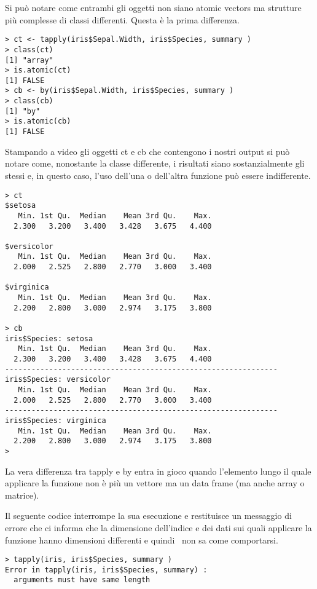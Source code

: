 Si può notare come entrambi gli oggetti non siano atomic vectors ma strutture più complesse di classi differenti.  Questa è la prima differenza.
\begin{lstlisting}	
> ct <- tapply(iris$Sepal.Width, iris$Species, summary )
> class(ct)
[1] "array"
> is.atomic(ct)
[1] FALSE
> cb <- by(iris$Sepal.Width, iris$Species, summary )
> class(cb)
[1] "by"
> is.atomic(cb)
[1] FALSE
\end{lstlisting}

Stampando a video gli oggetti ct e cb che contengono i nostri output si può notare come, nonostante la classe differente, i risultati siano sostanzialmente gli stessi e, in questo caso, l'uso dell'una o dell'altra funzione può essere indifferente.

\begin{lstlisting}	
> ct
$setosa
   Min. 1st Qu.  Median    Mean 3rd Qu.    Max. 
  2.300   3.200   3.400   3.428   3.675   4.400 

$versicolor
   Min. 1st Qu.  Median    Mean 3rd Qu.    Max. 
  2.000   2.525   2.800   2.770   3.000   3.400 

$virginica
   Min. 1st Qu.  Median    Mean 3rd Qu.    Max. 
  2.200   2.800   3.000   2.974   3.175   3.800 

> cb
iris$Species: setosa
   Min. 1st Qu.  Median    Mean 3rd Qu.    Max. 
  2.300   3.200   3.400   3.428   3.675   4.400 
-------------------------------------------------------------- 
iris$Species: versicolor
   Min. 1st Qu.  Median    Mean 3rd Qu.    Max. 
  2.000   2.525   2.800   2.770   3.000   3.400 
-------------------------------------------------------------- 
iris$Species: virginica
   Min. 1st Qu.  Median    Mean 3rd Qu.    Max. 
  2.200   2.800   3.000   2.974   3.175   3.800 
>  
\end{lstlisting}

La vera differenza tra \textsf{tapply} e \textsf{by} entra in gioco quando l'elemento lungo il quale applicare la funzione non è più un vettore ma un data frame (ma anche array o matrice).

Il seguente codice interrompe la sua esecuzione e restituisce un messaggio di errore che ci informa che la dimensione dell'indice e dei dati sui quali applicare la funzione hanno dimensioni differenti e quindi \erre\ non sa come comportarsi.

\begin{lstlisting}	
> tapply(iris, iris$Species, summary )
Error in tapply(iris, iris$Species, summary) : 
  arguments must have same length
\end{lstlisting}

